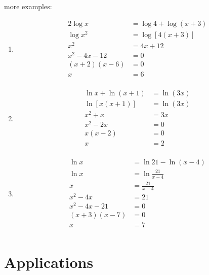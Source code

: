 \documentclass{exam}
\begin{document}
  more examples:
  \begin{enumerate}
    \item 
      \begin{align*}
        2 \log x       &= \log 4 + \log(x + 3) \\
        \log x^2       &= \log [4(x + 3)] \\
        x^2            &= 4x + 12 \\
        x^2 - 4x - 12  &= 0 \\
        (x + 2)(x - 6) &= 0 \\
        x              &= 6 \\
      \end{align*}

    \item
      \begin{align*}
        \ln x + \ln(x + 1) &= \ln (3x) \\
        \ln [x(x + 1)]     &= \ln (3x) \\
        x^2 + x            &= 3x \\
        x^2 - 2x           &= 0 \\
        x(x - 2)           &= 0 \\
        x                  &= 2 \\
      \end{align*}

    \item
      \begin{align*}
        \ln x          &= \ln 21 - \ln(x - 4) \\
        \ln x          &= \ln \frac{21}{x - 4} \\
        x              &= \frac{21}{x - 4} \\
        x^2 - 4x       &= 21 \\
        x^2 - 4x - 21  &= 0 \\
        (x + 3)(x - 7) &= 0 \\
        x              &= 7 \\
      \end{align*}

  \end{enumerate}

  \section{Applications}
\end{document}
